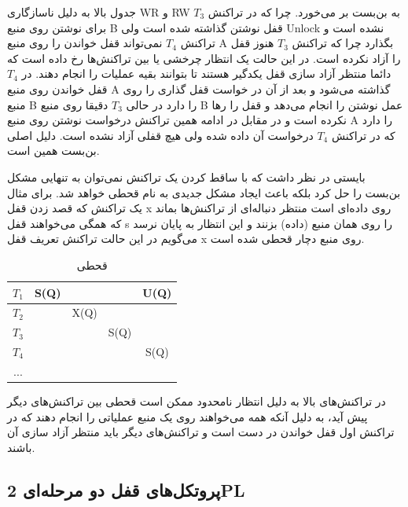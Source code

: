 \documentclass[a4paper]{article}
\begin{document}
جدول بالا به دلیل ناسازگاری WR و RW به بن‌بست بر می‌خورد. چرا که در تراکنش
$T_{3}$ برای نوشتن روی منبع B قفل نوشتن گذاشته شده است ولی Unlock نشده است و
تراکنش $T_{4}$ نمی‌تواند قفل خواندن را روی منبع A بگذارد چرا که تراکنش $T_{3}$
هنوز قفل را آزاد نکرده است. در این حالت یک انتظار چرخشی یا 
بین تراکنش‌ها رخ داده است که دائما منتظر آزاد سازی قفل یکدگیر هستند تا بتوانند
بقیه عملیات را انجام دهند. در $T_4$ قفل خواندن روی منبع A گذاشته می‌شود و بعد از
آن در خواست قفل گذاری را روی منبع B را دارد در حالی $T_3$ دقیقا روی منبع B عمل
نوشتن را انجام می‌دهد و قفل را رها نکرده است و در مقابل در ادامه همین تراکنش
درخواست نوشتن روی منبع A را دارد که در تراکنش $T_4$ درخواست آن داده شده ولی هیچ
قفلی آزاد نشده است. دلیل اصلی بن‌بست همین است.

بایستی در نظر داشت که با ساقط کردن یک تراکنش نمی‌توان به تنهایی مشکل بن‌بست را
حل کرد بلکه باعث ایجاد مشکل جدیدی به نام قحطی خواهد شد.  برای مثال یک تراکنش که
قصد زدن قفل x روی داده‌ای است منتظر دنباله‌ای از تراکنش‌ها بماند که همگی
می‌خواهند قفل s را روی همان منبع (داده) بزنند و این انتظار به پایان نرسد می‌گویم
در این حالت تراکنش تعریف قفل x روی منبع دچار قحطی شده است.

\begin{LTR}
    \begin{table}[h]
        \begin{RTL}
            \caption{قحطی}
        \end{RTL}
        \centering
            \begin{tabular}{c|c|c|c|c}
                $T_{1}$ & S(Q) & & & U(Q) \\ \hline
                $T_{2}$ & & X(Q) & & \\ \hline
                $T_{3}$ & & & S(Q) & \\ \hline
                $T_{4}$ & & & & S(Q) \\ \hline
                $...$ & & & & \\ 
            \end{tabular}
    \end{table}
\end{LTR}

در تراکنش‌های بالا به دلیل انتظار نامحدود ممکن است قحطی بین تراکنش‌های دیگر پیش
آید، به دلیل آنکه همه می‌خواهند روی یک منبع عملیاتی را انجام دهند که در تراکنش
اول قفل خواندن در دست است و تراکنش‌های دیگر باید منتظر آزاد سازی آن باشند.

\newpage

\subsection{پروتکل‌های قفل دو مرحله‌ای 2PL}
\end{document}
